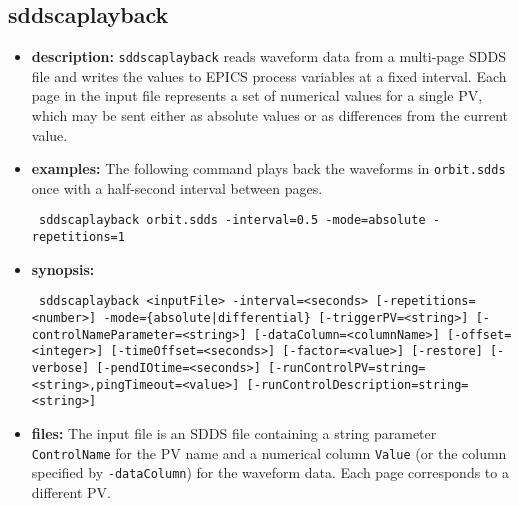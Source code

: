 %
%
\begin{latexonly}
\newpage
\end{latexonly}

\subsection{sddscaplayback}
\label{sddscaplayback}

\begin{itemize}
\item {\bf description:}
\verb+sddscaplayback+ reads waveform data from a multi-page SDDS file and writes the values to
EPICS process variables at a fixed interval. Each page in the input file represents a set of
numerical values for a single PV, which may be sent either as absolute values or as differences
from the current value.

\item {\bf examples:}
The following command plays back the waveforms in \verb+orbit.sdds+ once with a half-second
interval between pages.
\begin{flushleft}{\tt
sddscaplayback orbit.sdds -interval=0.5 -mode=absolute -repetitions=1
}\end{flushleft}

\item {\bf synopsis:}
\begin{flushleft}{\tt
sddscaplayback <inputFile> -interval=<seconds> [-repetitions=<number>]\
-mode=\{absolute|differential\} [-triggerPV=<string>] [-controlNameParameter=<string>]\
[-dataColumn=<columnName>] [-offset=<integer>] [-timeOffset=<seconds>]\
[-factor=<value>] [-restore] [-verbose] [-pendIOtime=<seconds>]\
[-runControlPV=string=<string>,pingTimeout=<value>]\
[-runControlDescription=string=<string>]
}\end{flushleft}

\item {\bf files:}
The input file is an SDDS file containing a string parameter \verb+ControlName+ for the PV name
and a numerical column \verb+Value+ (or the column specified by \verb+-dataColumn+) for the
waveform data. Each page corresponds to a different PV.


\end{itemize}
